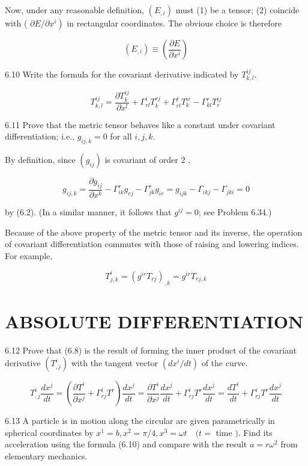 \documentclass[10pt]{article}
\begin{document}
Now, under any reasonable definition, $\left(E_{, i}\right)$ must (1) be a tensor; (2) coincide with ( $\left.\partial E / \partial x^{i}\right)$ in rectangular coordinates. The obvious choice is therefore

$$
\left(E_{, i}\right) \equiv\left(\frac{\partial E}{\partial x^{i}}\right)
$$

6.10 Write the formula for the covariant derivative indicated by $T_{k, l}^{i j}$.

$$
T_{k, l}^{i j}=\frac{\partial T_{k}^{i j}}{\partial x^{l}}+\Gamma_{r l}^{i} T_{k}^{r j}+\Gamma_{r l}^{j} T_{k}^{i r}-\Gamma_{k l}^{r} T_{r}^{i j}
$$

6.11 Prove that the metric tensor behaves like a constant under covariant differentiation; i.e., $g_{i j, k}=0$ for all $i, j, k$.

By definition, since $\left(g_{i j}\right)$ is covariant of order 2 ,

$$
g_{i j, k}=\frac{\partial g_{i j}}{\partial x^{k}}-\Gamma_{i k}^{r} g_{r j}-\Gamma_{j k}^{r} g_{i r}=g_{i j k}-\Gamma_{i k j}-\Gamma_{j k i}=0
$$

by (6.2). (In a similar manner, it follows that $g^{i j}=0$; see Problem 6.34.)

Because of the above property of the metric tensor and its inverse, the operation of covariant differentiation commutes with those of raising and lowering indices. For example,

$$
T_{j, k}^{i}=\left(g^{i r} T_{r j}\right)_{, k}=g^{i r} T_{r j, k}
$$

\section*{ABSOLUTE DIFFERENTIATION}
6.12 Prove that (6.8) is the result of forming the inner product of the covariant derivative $\left(T_{, j}^{i}\right)$ with the tangent vector $\left(d x^{i} / d t\right)$ of the curve.

$$
T_{, j}^{i} \frac{d x^{j}}{d t}=\left(\frac{\partial T^{i}}{\partial x^{j}}+\Gamma_{r j}^{i} T^{r}\right) \frac{d x^{j}}{d t}=\frac{\partial T^{i}}{\partial x^{j}} \frac{d x^{j}}{d t}+\Gamma_{r j}^{i} T^{r} \frac{d x^{j}}{d t}=\frac{d T^{i}}{d t}+\Gamma_{r j}^{i} T^{r} \frac{d x^{j}}{d t}
$$

6.13 A particle is in motion along the circular arc given parametrically in spherical coordinates by $x^{1}=b, x^{2}=\pi / 4, x^{3}=\omega t \quad(t=$ time $)$. Find its acceleration using the formula (6.10) and compare with the result $a=r \omega^{2}$ from elementary mechanics.
\end{document}

